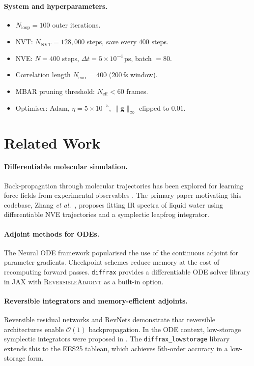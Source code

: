 \documentclass{article}
\newcommand{\EES}{\textsc{EES25}}
\newcommand{\RevAdj}{\textsc{ReversibleAdjoint}}
\newcommand{\diffrax}{\texttt{diffrax}}
\begin{document}
\paragraph{System and hyperparameters.}
\begin{itemize}
  \item $N_\mathrm{loop} = 100$ outer iterations.
  \item NVT: $N_\mathrm{NVT} = 128{,}000$ steps, save every 400 steps.
  \item NVE: $N = 400$ steps, $\Delta t = 5\times10^{-4}$\,ps, batch $= 80$.
  \item Correlation length $N_\mathrm{corr} = 400$ (200\,fs window).
  \item MBAR pruning threshold: $N_\mathrm{eff} < 60$ frames.
  \item Optimiser: Adam, $\eta = 5\times10^{-5}$,
    $\|\bm{g}\|_\infty$ clipped to $0.01$.
\end{itemize}

\section{Related Work}
\label{sec:related}

\paragraph{Differentiable molecular simulation.}
Back-propagation through molecular trajectories has been explored for learning
force fields from experimental observables \cite{wang2020differentiable,
Schoenholz2021jax, thaler2021learning}.  The primary paper motivating this
codebase, Zhang \emph{et al.}\ \cite{zhang2024refining}, proposes fitting IR
spectra of liquid water using differentiable NVE trajectories and a
symplectic leapfrog integrator.

\paragraph{Adjoint methods for ODEs.}
The Neural ODE framework \cite{chen2018neural} popularised the use of the
continuous adjoint for parameter gradients.  Checkpoint schemes
\cite{chen2016training} reduce memory at the cost of recomputing forward
passes.  \diffrax{} \cite{diffrax2022} provides a differentiable ODE solver
library in JAX with \RevAdj{} as a built-in option.

\paragraph{Reversible integrators and memory-efficient adjoints.}
Reversible residual networks \cite{gomez2017reversible} and
RevNets demonstrate that reversible architectures enable
$\mathcal{O}(1)$ backpropagation.  In the ODE context, low-storage
symplectic integrators were proposed in \cite{symplectic_adjoint2021}.
The \texttt{diffrax\_lowstorage} library extends this to the \EES{} tableau,
which achieves 5th-order accuracy in a low-storage form.
\end{document}
